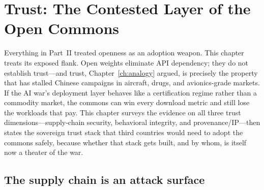 \chapter{Trust: The Contested Layer of the Open Commons}
\label{ch:trust}

Everything in Part~II treated openness as an adoption weapon. This chapter treats its exposed flank. Open weights eliminate API dependency; they do not establish trust---and trust, Chapter~\ref{ch:analogy} argued, is precisely the property that has stalled Chinese campaigns in aircraft, drugs, and avionics-grade markets. If the AI war's deployment layer behaves like a certification regime rather than a commodity market, the commons can win every download metric and still lose the workloads that pay. This chapter surveys the evidence on all three trust dimensions---supply-chain security, behavioral integrity, and provenance/IP---then states the sovereign trust stack that third countries would need to adopt the commons safely, because whether that stack gets built, and by whom, is itself now a theater of the war.

\section{The supply chain is an attack surface}

